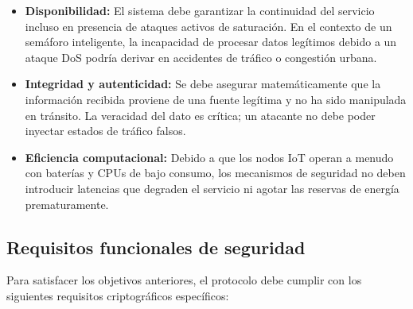 \documentclass[conference,a4paper,onecolumn,11pt]{IEEEtran} %
\begin{document}
\begin{itemize}
    \item \textbf{Disponibilidad:} El sistema debe garantizar la continuidad del servicio incluso en presencia de ataques activos de saturación. En el contexto de un semáforo inteligente, la incapacidad de procesar datos legítimos debido a un ataque DoS podría derivar en accidentes de tráfico o congestión urbana.
    
    \item \textbf{Integridad y autenticidad:} Se debe asegurar matemáticamente que la información recibida proviene de una fuente legítima y no ha sido manipulada en tránsito. La veracidad del dato es crítica; un atacante no debe poder inyectar estados de tráfico falsos.
    
    \item \textbf{Eficiencia computacional:} Debido a que los nodos IoT operan a menudo con baterías y CPUs de bajo consumo, los mecanismos de seguridad no deben introducir latencias que degraden el servicio ni agotar las reservas de energía prematuramente.
\end{itemize}

\subsection{Requisitos funcionales de seguridad}
Para satisfacer los objetivos anteriores, el protocolo debe cumplir con los siguientes requisitos criptográficos específicos:
\end{document}
